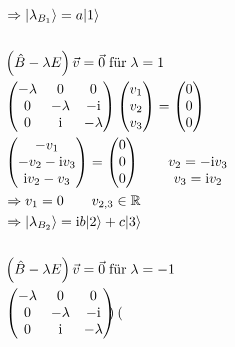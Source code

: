 \begin{align*}
    &\Rightarrow \lvert\lambda_{B_1}\rangle = a\lvert1\rangle\\
    \\
    &\left( \hat{B}-\lambda E \right) \vec{v} = \vec{0}\;\text{für}\;\lambda = 1\\
    &\begin{pmatrix}
        -\lambda & 0 & 0\\
        0 & -\lambda & -\text{i}\\
        0 & \text{i} & -\lambda
    \end{pmatrix}
    \begin{pmatrix}
        v_1\\
        v_2\\
        v_3
    \end{pmatrix}
    =
    \begin{pmatrix}
        0\\
        0\\
        0
    \end{pmatrix}\\
    &\begin{pmatrix}
        -v_1\\
        -v_2-\text{i}v_3\\
        \text{i}v_2-v_3
    \end{pmatrix}
    =
    \begin{pmatrix}
        0\\
        0\\
        0
    \end{pmatrix}
    \qquad
    \begin{matrix}
        \\
        v_2=-\text{i}v_3\\
        v_3=\text{i}v_2
    \end{matrix}\\
    &\Rightarrow v_1=0 \qquad v_{2,3}\in \mathbb{R}\\
    &\Rightarrow \lvert\lambda_{B_2}\rangle = \text{i}b\lvert2\rangle+c\lvert3\rangle\\
    \\
    &\left( \hat{B}-\lambda E \right) \vec{v} = \vec{0}\;\text{für}\;\lambda = -1\\
    &\begin{pmatrix}
        -\lambda & 0 & 0\\
        0 & -\lambda & -\text{i}\\
        0 & \text{i} & -\lambda
    \end{pmatrix}
    \begin{pmatrix}

\end{pmatrix}
\end{align*}
